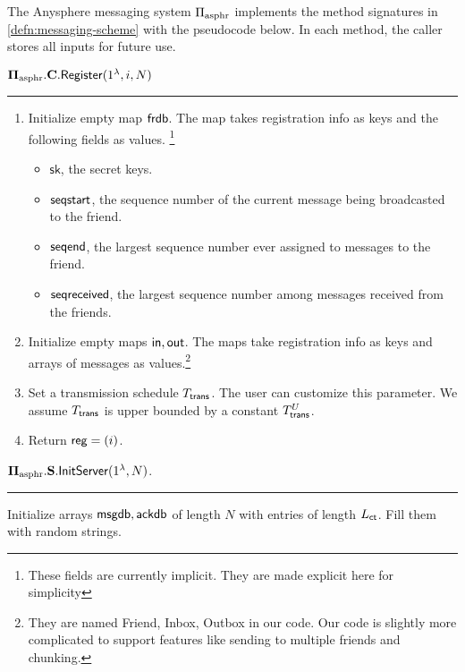 \begin{definition}
\label{defn:asphr-code}
The Anysphere messaging system $\Pi_{\text{asphr}}$ implements the method signatures in \cref{defn:messaging-scheme} with the pseudocode below. In each method, the caller stores all inputs for future use.
\vspace{10pt}

$\mathbf{\Pi_{\text{asphr}}.C.\mathsf{Register}}(1^{\lambda}, i, N)$
\vspace{5pt}
\hrule
\vspace{5pt}
\begin{enumerate}
    \item Initialize empty map $\mathsf{frdb}$. The map takes registration info as keys and the following fields as values.    \footnote{These fields are currently implicit. They are made explicit here for simplicity}
    \begin{itemize}
        \item $\mathsf{sk}$, the secret keys.
        \item $\mathsf{seqstart}$, the sequence number of the current message being broadcasted to the friend.
        \item $\mathsf{seqend}$, the largest sequence number ever assigned to messages to the friend.
        \item $\mathsf{seqreceived}$, the largest sequence number among messages received from the friends.
    \end{itemize}

    \item Initialize empty maps $\mathsf{in}, \mathsf{out}$. The maps take registration info as keys and arrays of messages as values.\footnote{They are named Friend, Inbox, Outbox in our code. Our code is slightly more complicated to support features like sending to multiple friends and chunking.}
    \item Set a transmission schedule $T_{\mathsf{trans}}$. The user can customize this parameter. We assume $T_{\mathsf{trans}}$ is upper bounded by a constant $T_{\mathsf{trans}}^U$.
    \item Return $\mathsf{reg} = (i)$.
\end{enumerate}
\vspace{10pt}
$\mathbf{\Pi_{\text{asphr}}.S.\mathsf{InitServer}}(1^{\lambda}, N)$.
\vspace{5pt}
\hrule
\vspace{5pt}
Initialize arrays $\mathsf{msgdb}, \mathsf{ackdb}$ of length $N$ with entries of length $L_{\mathsf{ct}}$. Fill them with random strings.


\end{definition}
